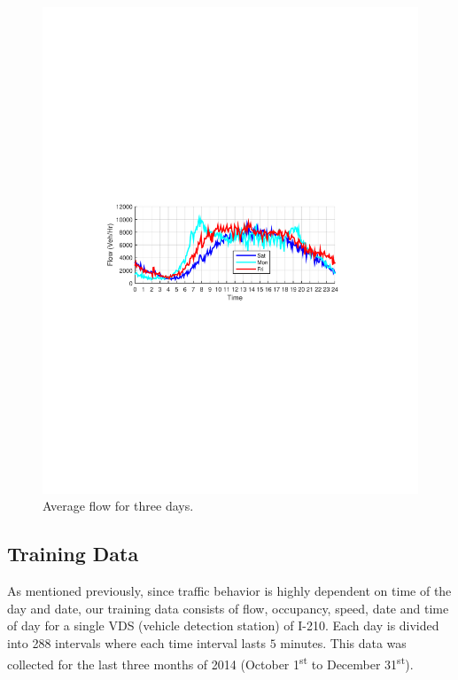 \documentclass[twocolumn,10pt]{asme2e}
\begin{document}
\begin{figure}[h]
	\centering
	\includegraphics[width=0.7\linewidth]{./Figures/flw1}
	\caption{Average flow for three days.}
	\label{fig:flw1}
\end{figure} 

\subsection{Training Data}

As mentioned previously, since traffic behavior is highly dependent on time of the day and date, our training data consists of flow, occupancy, speed, date and time of day for a single VDS (vehicle detection station) of I-210. Each day is divided into 288 intervals where each time interval lasts $5$ minutes. This data was collected for the last three months of 2014 (October 1\textsuperscript{st} to December 31\textsuperscript{st}).
\end{document}

